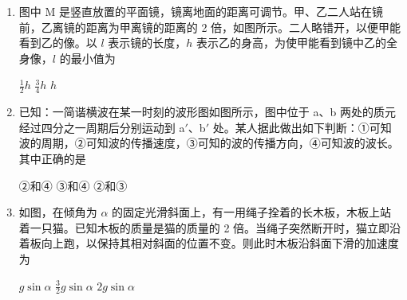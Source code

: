 \documentclass[\gkver]{gaokaozhenti}
\begin{document}
\begin{enumerate}
\item
图中 M 是竖直放置的平面镜，镜离地面的距离可调节。甲、乙二人站在镜前，乙离镜的距离为甲离镜的距离的 2 倍，如图所示。二人略错开，以便甲能看到乙的像。以 $l$ 表示镜的长度，$h$ 表示乙的身高，为使甲能看到镜中乙的全身像，$l$ 的最小值为


{$\frac{1}{2}h$}
{$\frac{3}{4}h$}
{$h$}

\item
已知：一简谐横波在某一时刻的波形图如图所示，图中位于 a、b 两处的质元经过四分之一周期后分别运动到 a$'$、b$'$ 处。某人据此做出如下判断：①可知波的周期，②可知波的传播速度，③可知的波的传播方向，④可知波的波长。其中正确的是


{②和④}
{③和④}
{②和③}

\item
如图，在倾角为 $\alpha$ 的固定光滑斜面上，有一用绳子拴着的长木板，木板上站着一只猫。已知木板的质量是猫的质量的 2 倍。当绳子突然断开时，猫立即沿着板向上跑，以保持其相对斜面的位置不变。则此时木板沿斜面下滑的加速度为


{$g\sin\alpha$}
{$\frac{3}{2}g\sin\alpha$}
{$2g\sin\alpha$}


\end{enumerate}
\end{document}
